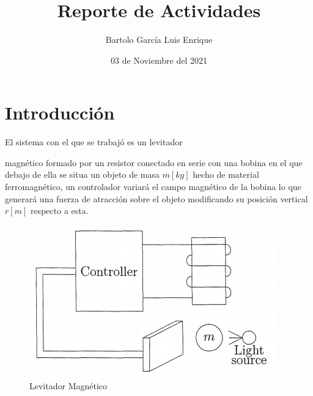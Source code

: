 \documentclass[onecolumn,10pt]{article}
\title{Reporte de Actividades}
\author{Bartolo Garc\'ia Luis Enrique}
\date{03 de Noviembre del 2021}
\begin{document}

\section{Introducci\'on}
El sistema con el que se trabaj\'o es un levitador 

magn\'etico formado por un resistor conectado en serie con una bobina en el que debajo de ella se situa un objeto de masa $m[kg]$ hecho de material ferromagn\'etico, un controlador variar\'a el campo magn\'etico de la bobina lo que generar\'a una fuerza de atracci\'on sobre el objeto modificando su posici\'on vertical $r[m]$ respecto a esta.

\begin{figure}[h]
\centering
\includegraphics[scale=0.5]{levitador.png}
\caption{Levitador Magn\'etico}
\label{levitador}
\end{figure}
\end{document}
